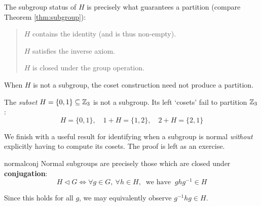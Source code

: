 The subgroup status of $H$ is precisely what guarantees a partition (compare Theorem \ref{thm:subgroup}):
\begin{quote}
	\begin{description}\itemsep2pt
		\item[\normalfont\emph{Reflexivity}:]  $H$ contains the identity (and is thus non-empty).
		\item[\normalfont\emph{Symmetry}:] $H$ satisfies the inverse axiom.
		\item[\normalfont\emph{Transitivity}:] $H$ is closed under the group operation.
	\end{description}
\end{quote}

When $H$ is not a subgroup, the coset construction need not produce a partition.

\begin{example}{}{}
	The \emph{subset} $H=\{0,1\}\subseteq\mathbb{Z}_3$ is not a subgroup. Its left `cosets' fail to partition $\mathbb{Z}_3$:
	\[
		H=\{0,1\},\quad 1+H=\{1,2\},\quad 2+H=\{2,1\}
	\]
\end{example}

\goodbreak

We finish with a useful result for identifying when a subgroup is normal \emph{without} explicitly having to compute its cosets. The proof is left as an exercise.

\begin{cor}{}{normalconj}
	Normal subgroups are precisely those which are closed under \textbf{conjugation}:
  \[
  	H\triangleleft G\iff \forall g\in G,\ \forall h\in H,
  	\ \text{ we have }\ 
  	gh g^{-1}\in H
  \]
\end{cor}

Since this holds for all $g$, we may equivalently observe $g^{-1}hg\in H$. 




